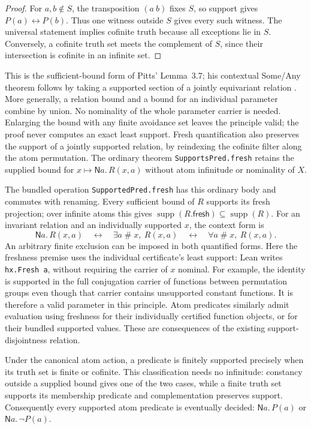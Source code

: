 \begin{proof}
For $a,b\notin S$, the transposition $(a\ b)$ fixes $S$, so support
gives $P(a)\leftrightarrow P(b)$. Thus one witness outside $S$ gives
every such witness. The universal statement implies cofinite truth because
all exceptions lie in $S$. Conversely, a cofinite truth set meets the
complement of $S$, since their intersection is cofinite in an infinite set.
\end{proof}

This is the sufficient-bound form of Pitts' Lemma~3.7; his contextual
Some/Any theorem follows by taking a supported section of a jointly
equivariant relation \cite[Theorem~3.9]{pitts2013}.
More generally, a relation bound and a bound for an individual parameter
combine by union. No nominality of the whole parameter carrier is needed.
Enlarging the bound with any finite avoidance set leaves the principle valid;
the proof never computes an exact least support. Fresh quantification also
preserves the support of a jointly supported relation, by reindexing the
cofinite filter along the atom permutation. The ordinary theorem
\texttt{SupportsPred.fresh} retains the supplied bound for
$x\mapsto\mathsf N a.\,R(x,a)$ without atom infinitude or nominality of $X$.

The bundled operation \texttt{SupportedPred.fresh} has this ordinary body
and commutes with renaming. Every sufficient bound of $R$ supports its fresh
projection; over infinite atoms this gives
$\operatorname{supp}(R.\mathsf{fresh})\subseteq\operatorname{supp}(R)$.
For an invariant relation and an individually supported $x$, the context form is
\[
 \mathsf N a.\,R(x,a)
 \quad\longleftrightarrow\quad
 \exists a\mathrel{\#}x,\ R(x,a)
 \quad\longleftrightarrow\quad
 \forall a\mathrel{\#}x,\ R(x,a).
\]
An arbitrary finite exclusion can be imposed in both quantified forms.
Here the freshness premise uses the individual certificate's least support:
Lean writes \texttt{hx.Fresh a}, without requiring the carrier of $x$ nominal.
For example, the identity is supported in the full conjugation carrier of
functions between permutation groups even though that carrier contains
unsupported constant functions. It is therefore a valid parameter in this
principle. Atom predicates similarly admit evaluation using freshness for
their individually certified function objects, or for their bundled supported
values. These are consequences of the existing support-disjointness relation.

Under the canonical atom action, a predicate is finitely supported precisely
when its truth set is finite or cofinite. This classification needs no
infinitude: constancy outside a supplied bound gives one of the two cases,
while a finite truth set supports its membership predicate and complementation
preserves support. Consequently every supported atom predicate is eventually
decided: $\mathsf N a.\,P(a)$ or $\mathsf N a.\,\neg P(a)$.

